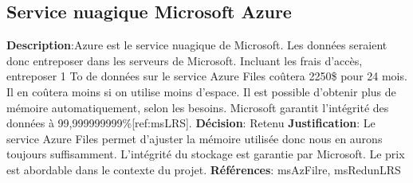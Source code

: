 

\subsection{Service nuagique Microsoft Azure}
\label{s:archiver_conc3}

\textbf{Description}:Azure est le service nuagique de Microsoft. Les données seraient donc entreposer dans les serveurs de Microsoft. Incluant les frais d’accès, entreposer 1 To de données sur le service Azure Files coûtera 2250\$ pour 24 mois. Il en coûtera moins si on utilise moins d’espace. Il est possible d’obtenir plus de mémoire automatiquement, selon les besoins. Microsoft garantit l’intégrité des données à 99,999999999\%[ref:msLRS].
\textbf{Décision}: Retenu 
\textbf{Justification}: Le service Azure Files permet d’ajuster la mémoire utilisée donc nous en aurons toujours suffisamment. L’intégrité du stockage est garantie par Microsoft. Le prix est abordable dans le contexte du projet.
\textbf{Références}: 
msAzFilre, msRedunLRS
